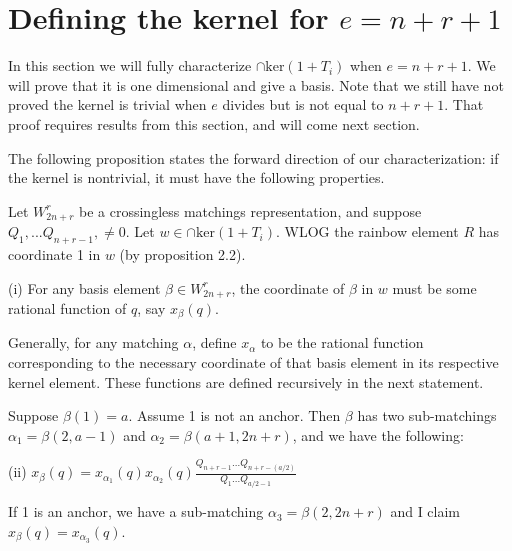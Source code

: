 \documentclass{amsart}
\begin{document}
\newpage
\section{Defining the kernel for $e=n+r+1$}
In this section we will fully characterize $\cap\text{ker}(1+T_i)$ when $e=n+r+1$. We will prove that it is one dimensional and give a basis. Note that we still have not proved the kernel is trivial when $e$ divides but is not equal to $n+r+1$. That proof requires results from this section, and will come next section.

\vspace{5mm}
The following proposition states the forward direction of our characterization: if the kernel is nontrivial, it must have the following properties.

\vspace{5mm}
\begin{proposition}
	
	Let $W_{2n+r}^r$ be a crossingless matchings representation, and suppose $Q_1,...Q_{n+r-1},\not=0$. Let $w\in\cap\text{ker}(1+T_i)$. WLOG the rainbow element $R$ has coordinate 1 in $w$ (by proposition 2.2).
	\\
	
	\begin{center}	
		(i) For any basis element $\beta\in W_{2n+r}^r$, the coordinate of $\beta$ in $w$ must be some rational function of $q$, say $x_\beta(q)$.
		
	\end{center}
	\vspace{5mm}
	
	
	Generally, for any matching $\alpha$, define $x_\alpha$ to be the rational function corresponding to the necessary coordinate of that basis element in its respective kernel element. These functions are defined recursively in the next statement.
	
	\vspace{5mm}
	Suppose $\beta(1)=a$. Assume 1 is not an anchor. Then $\beta$ has two sub-matchings $\alpha_1=\beta(2,a-1)$ and $\alpha_2=\beta(a+1,2n+r)$, and we have the following:
	\\
	
	\begin{center}
		
		(ii) $x_\beta(q)=x_{\alpha_1}(q)x_{\alpha_2}(q)\frac{Q_{n+r-1}...Q_{n+r-(a/2)}}{Q_1...Q_{a/2-1}}$
		
		
	\end{center}
	
	\vspace{5mm}
	
	If 1 is an anchor, we have a sub-matching $\alpha_3=\beta(2,2n+r)$ and I claim $x_\beta(q)=x_{\alpha_3}(q)$. 
	
\end{proposition}
\end{document}
